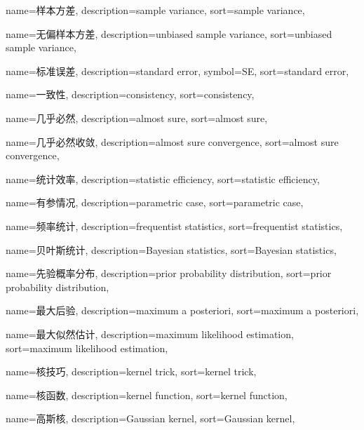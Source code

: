 {
  name=样本方差, %
  description={sample variance},
  sort={sample variance},
}

{
  name=无偏样本方差, %
  description={unbiased sample variance},
  sort={unbiased sample variance},
}

{
  name=标准误差,
  description={standard error},
  symbol={SE},
  sort={standard error},
}

{
  name=一致性,
  description={consistency},
  sort={consistency},
}

{
  name=几乎必然,
  description={almost sure},
  sort={almost sure},
}

{
  name=几乎必然收敛,
  description={almost sure convergence},
  sort={almost sure convergence},
}

{
  name=统计效率,
  description={statistic efficiency},
  sort={statistic efficiency},
}

{
  name=有参情况,
  description={parametric case},
  sort={parametric case},
}

{
  name=频率统计,
  description={frequentist statistics},
  sort={frequentist statistics},
}

{
  name=贝叶斯统计,
  description={Bayesian statistics},
  sort={Bayesian statistics},
}

{
  name=先验概率分布,
  description={prior probability distribution},
  sort={prior probability distribution},
}

{
  name=最大后验,
  description={maximum a posteriori},
  sort={maximum a posteriori},
}

{
  name=最大似然估计,
  description={maximum likelihood estimation},
  sort={maximum likelihood estimation},
}

{
  name=核技巧,
  description={kernel trick},
  sort={kernel trick},
}

{
  name=核函数,
  description={kernel function},
  sort={kernel function},
}

{
  name=高斯核,
  description={Gaussian kernel},
  sort={Gaussian kernel},
}

